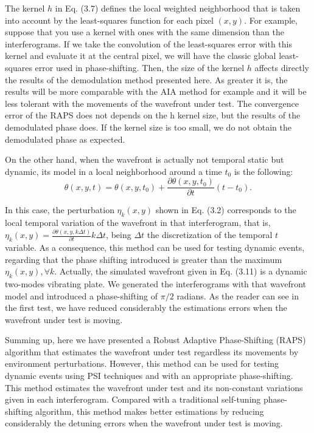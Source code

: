 The kernel $h$ in Eq. (3.7) defines the local weighted neighborhood that is
taken into account by the least-squares function for each pixel $(x,y)$. For
example, suppose that you use a kernel with ones with the same dimension than
the interferograms. If we take the convolution of the least-squares error with
this kernel and evaluate it at the central pixel, we will have the classic
global least-squares error used in phase-shifting. Then, the size of the kernel
$h$ affects directly the results of the demodulation method presented here. As
greater it is, the results will be more comparable with the AIA method for
example and it will be less tolerant with the movements of the wavefront under
test. The convergence error of the RAPS does not depends on the h kernel
size, but the results of the demodulated phase does. If the kernel size is too
small, we do not obtain the demodulated phase as expected.

On the other hand, when the wavefront is actually not temporal static but
dynamic, its model in a local neighborhood around a time $t_0$ is the following:
\begin{equation}
 \theta(x,y,t)= \theta(x,y,t_0) + \frac{\partial \theta(x,y,t_0) }{\partial t}
 (t-t_0).
\end{equation}

In this case, the perturbation $\eta_k(x,y)$ shown in Eq. (3.2) corresponds to
the local temporal variation of the wavefront in that interferogram, that is,
$\eta_k (x,y)= \frac{\partial \theta(x,y,k\Delta t)}{\partial t} k \Delta t$,
being $\Delta t$ the discretization of the temporal $t$ variable. As a
consequence, this method can be used for testing dynamic events, regarding that
the phase shifting introduced is greater than the maximum $\eta_k(x,y),\forall
k$. Actually, the simulated wavefront given in Eq. (3.11) is a dynamic
two-modes vibrating plate. We generated the interferograms with that wavefront
model and introduced a phase-shifting of $\pi/2$ radians. As the reader can
see in the first test, we have reduced considerably the estimations errors when
the wavefront under test is moving.

Summing up, here we have presented a Robust Adaptive Phase-Shifting (RAPS)
algorithm that estimates the wavefront under test regardless its movements by
environment perturbations. However, this method can be used for testing dynamic
events using PSI techniques and with an appropriate phase-shifting. This method
estimates the wavefront under test and its non-constant variations given in each
interferogram. Compared with a traditional self-tuning phase-shifting algorithm,
this method makes better estimations by reducing considerably the detuning
errors when the wavefront under test is moving.
